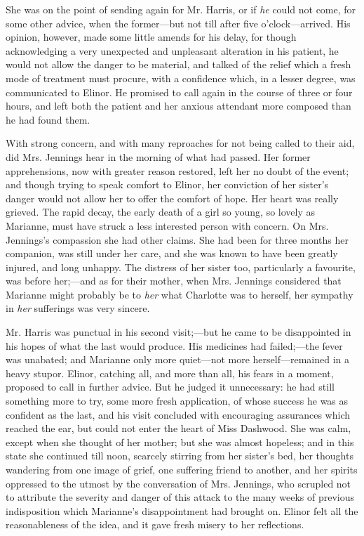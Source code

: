 She was on the point of sending again for Mr. Harris, or if {\em he} could not come, for some other advice, when the former---but not till after five o'clock---arrived. His opinion, however, made some little amends for his delay, for though acknowledging a very unexpected and unpleasant alteration in his patient, he would not allow the danger to be material, and talked of the relief which a fresh mode of treatment must procure, with a confidence which, in a lesser degree, was communicated to Elinor. He promised to call again in the course of three or four hours, and left both the patient and her anxious attendant more composed than he had found them.

With strong concern, and with many reproaches for not being called to their aid, did Mrs. Jennings hear in the morning of what had passed. Her former apprehensions, now with greater reason restored, left her no doubt of the event; and though trying to speak comfort to Elinor, her conviction of her sister's danger would not allow her to offer the comfort of hope. Her heart was really grieved. The rapid decay, the early death of a girl so young, so lovely as Marianne, must have struck a less interested person with concern. On Mrs. Jennings's compassion she had other claims. She had been for three months her companion, was still under her care, and she was known to have been greatly injured, and long unhappy. The distress of her sister too, particularly a favourite, was before her;---and as for their mother, when Mrs. Jennings considered that Marianne might probably be to {\em her} what Charlotte was to herself, her sympathy in {\em her} sufferings was very sincere.

Mr. Harris was punctual in his second visit;---but he came to be disappointed in his hopes of what the last would produce. His medicines had failed;---the fever was unabated; and Marianne only more quiet---not more herself---remained in a heavy stupor. Elinor, catching all, and more than all, his fears in a moment, proposed to call in further advice. But he judged it unnecessary: he had still something more to try, some more fresh application, of whose success he was as confident as the last, and his visit concluded with encouraging assurances which reached the ear, but could not enter the heart of Miss Dashwood. She was calm, except when she thought of her mother; but she was almost hopeless; and in this state she continued till noon, scarcely stirring from her sister's bed, her thoughts wandering from one image of grief, one suffering friend to another, and her spirits oppressed to the utmost by the conversation of Mrs. Jennings, who scrupled not to attribute the severity and danger of this attack to the many weeks of previous indisposition which Marianne's disappointment had brought on. Elinor felt all the reasonableness of the idea, and it gave fresh misery to her reflections.

